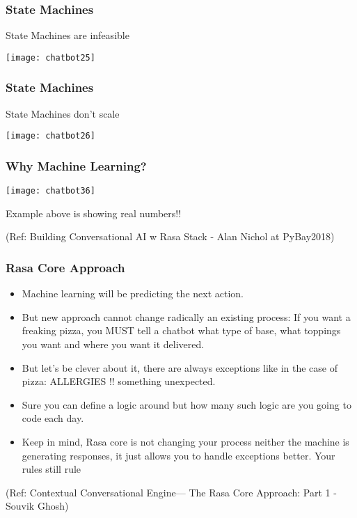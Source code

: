  \begin{frame}[fragile]\frametitle{State Machines}
State Machines are infeasible

\begin{center}
\texttt{[image: chatbot25]}

\end{center}

\end{frame}


 \begin{frame}[fragile]\frametitle{State Machines}
State Machines don't scale

\begin{center}
\texttt{[image: chatbot26]}

\end{center}

\end{frame}


 \begin{frame}[fragile]\frametitle{Why Machine Learning?}
\begin{center}
\texttt{[image: chatbot36]}

\end{center}

Example above is showing real numbers!!


{\tiny (Ref: Building Conversational AI w Rasa Stack - Alan Nichol at PyBay2018)}

\end{frame}


 \begin{frame}[fragile]\frametitle{Rasa Core Approach}
\begin{itemize}
\item Machine learning will be predicting the next action.
\item But new approach cannot change radically an existing process: If you want a freaking pizza, you MUST tell a chatbot what type of base, what toppings you want and where you want it delivered.
\item 
But let's be clever about it, there are always exceptions like in the case of pizza: ALLERGIES !! something unexpected. 
\item Sure you can define a logic around but how many such logic are you going to code each day.
\item Keep in mind, Rasa core is not changing your process neither the machine is generating responses, it just allows you to handle exceptions better. Your rules still rule
\end{itemize}

\tiny{(Ref: Contextual Conversational Engine— The Rasa Core Approach: Part 1 - Souvik Ghosh)}

\end{frame}


